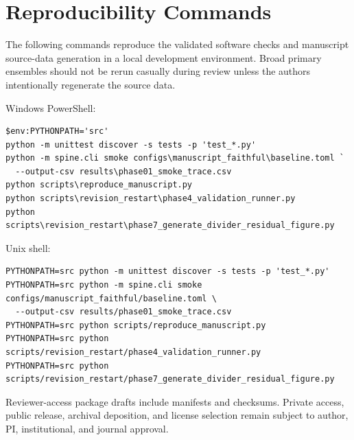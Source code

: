 \section{Reproducibility Commands}

The following commands reproduce the validated software checks and manuscript source-data generation in a local development environment. Broad primary ensembles should not be rerun casually during review unless the authors intentionally regenerate the source data.

Windows PowerShell:
\begingroup\footnotesize
\begin{verbatim}
$env:PYTHONPATH='src'
python -m unittest discover -s tests -p 'test_*.py'
python -m spine.cli smoke configs\manuscript_faithful\baseline.toml `
  --output-csv results\phase01_smoke_trace.csv
python scripts\reproduce_manuscript.py
python scripts\revision_restart\phase4_validation_runner.py
python scripts\revision_restart\phase7_generate_divider_residual_figure.py
\end{verbatim}
\endgroup

Unix shell:
\begingroup\footnotesize
\begin{verbatim}
PYTHONPATH=src python -m unittest discover -s tests -p 'test_*.py'
PYTHONPATH=src python -m spine.cli smoke configs/manuscript_faithful/baseline.toml \
  --output-csv results/phase01_smoke_trace.csv
PYTHONPATH=src python scripts/reproduce_manuscript.py
PYTHONPATH=src python scripts/revision_restart/phase4_validation_runner.py
PYTHONPATH=src python scripts/revision_restart/phase7_generate_divider_residual_figure.py
\end{verbatim}
\endgroup

Reviewer-access package drafts include manifests and checksums. Private access, public release, archival deposition, and license selection remain subject to author, PI, institutional, and journal approval.
